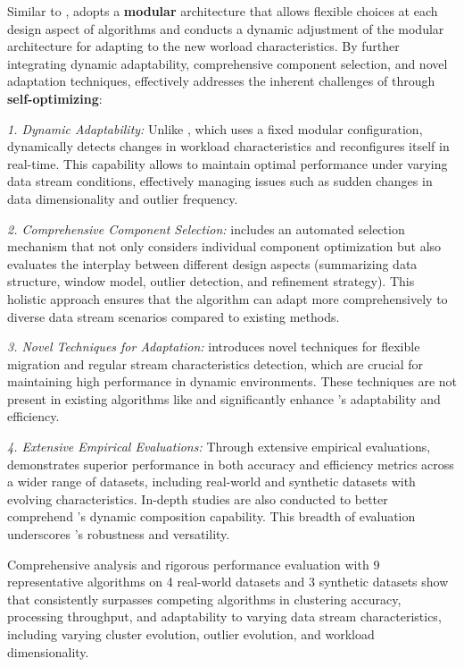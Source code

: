 Similar to \benne, \algo adopts a \textbf{modular} architecture that allows flexible choices at each design aspect of \dsc algorithms and conducts a  dynamic adjustment of the modular architecture for adapting to the new worload characteristics. By further integrating dynamic adaptability, comprehensive component selection, and novel adaptation techniques, \algo effectively addresses the inherent challenges of \dsc through \textbf{self-optimizing}:

\emph{1. Dynamic Adaptability:} Unlike \benne, which uses a fixed modular configuration, \algo dynamically detects changes in workload characteristics and reconfigures itself in real-time. This capability allows \algo to maintain optimal performance under varying data stream conditions, effectively managing issues such as sudden changes in data dimensionality and outlier frequency.

\emph{2. Comprehensive Component Selection:} \algo includes an automated selection mechanism that not only considers individual component optimization but also evaluates the interplay between different design aspects (summarizing data structure, window model, outlier detection, and refinement strategy). This holistic approach ensures that the algorithm can adapt more comprehensively to diverse data stream scenarios compared to existing methods.

\emph{3. Novel Techniques for Adaptation:} \algo introduces novel techniques for flexible migration and regular stream characteristics detection, which are crucial for maintaining high performance in dynamic environments. These techniques are not present in existing algorithms like \benne and significantly enhance \algo's adaptability and efficiency.

\emph{4. Extensive Empirical Evaluations:} Through extensive empirical evaluations, \algo demonstrates superior performance in both accuracy and efficiency metrics across a wider range of datasets, including real-world and synthetic datasets with evolving characteristics. In-depth studies are also conducted to better comprehend \algo's dynamic composition capability. This breadth of evaluation underscores \algo's robustness and versatility.

Comprehensive analysis and rigorous performance evaluation with 9 representative \dsc algorithms on 4 real-world datasets and 3 synthetic datasets show that \algo consistently surpasses competing algorithms in clustering accuracy, processing throughput, and adaptability to varying data stream characteristics, including varying cluster evolution, outlier evolution, and workload dimensionality. 

